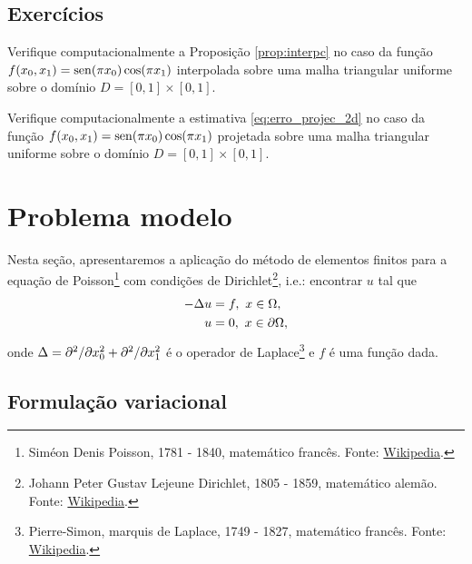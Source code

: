 \subsection*{Exercícios}

\begin{exer}
  Verifique computacionalmente a Proposição \ref{prop:interpc} no caso da função $f(x_0,x_1) = \operatorname{sen}(\pi x_0)\cos(\pi x_1)$ interpolada sobre uma malha triangular uniforme sobre o domínio $D = [0, 1]\times [0, 1]$.
\end{exer}

\begin{exer}
  Verifique computacionalmente a estimativa \eqref{eq:erro_projec_2d} no caso da função $f(x_0,x_1) = \operatorname{sen}(\pi x_0)\cos(\pi x_1)$ projetada sobre uma malha triangular uniforme sobre o domínio $D = [0, 1]\times [0, 1]$.
\end{exer}

\section{Problema modelo}\label{cap_mef2d_sec_probmodelo}

Nesta seção, apresentaremos a aplicação do método de elementos finitos para a equação de Poisson\footnote{Siméon Denis Poisson, 1781 - 1840, matemático francês. Fonte: \href{https://en.wikipedia.org/wiki/Sim\%C3\%A9on_Denis_Poisson}{Wikipedia}.} com condições de Dirichlet\footnote{Johann Peter Gustav Lejeune Dirichlet, 1805 - 1859, matemático alemão. Fonte: \href{https://en.wikipedia.org/wiki/Peter_Gustav_Lejeune_Dirichlet}{Wikipedia}.}, i.e.: encontrar $u$ tal que
\begin{align}
  -\Delta u &= f,~x\in\Omega,\label{eq:mef2d_pm_eq}\\
  u &= 0,~x\in\partial\Omega,\label{eq:mef2d_pm_bc}
\end{align}
onde $\Delta = \partial^2/\partial x_0^2 + \partial^2/\partial x_1^2$ é o operador de Laplace\footnote{Pierre-Simon, marquis de Laplace, 1749 - 1827, matemático francês. Fonte: \href{https://en.wikipedia.org/wiki/Pierre-Simon_Laplace}{Wikipedia}.} e $f$ é uma função dada.

\subsection{Formulação variacional}

